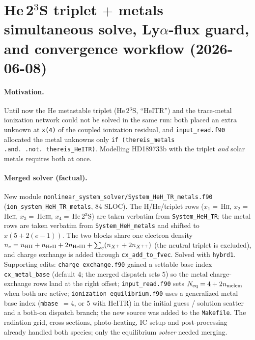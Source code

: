\documentclass[english,a4paper]{kiseon_memo}
\begin{document}
\section{He\,2$^3$S triplet $+$ metals simultaneous solve, Ly$\alpha$-flux guard, and convergence workflow (2026-06-08)}

\paragraph{Motivation.} Until now the He metastable triplet (He\,2$^3$S, ``HeITR'')
and the trace-metal ionization network could not be solved in the same run: both
placed an extra unknown at \texttt{x(4)} of the coupled ionization residual, and
\texttt{input\_read.f90} allocated the metal unknowns only \texttt{if (thereis\_metals
.and.\ .not.\ thereis\_HeITR)}. Modelling HD189733b with the triplet \emph{and} solar
metals requires both at once.

\paragraph{Merged solver (factual).} New module
\texttt{nonlinear\_system\_solver/System\_HeH\_TR\_metals.f90}
(\texttt{ion\_system\_HeH\_TR\_metals}, 84 SLOC). The H/He/triplet rows
($x_1{=}$\,H\textsc{ii}, $x_2{=}$\,He\textsc{ii}, $x_3{=}$\,He\textsc{iii},
$x_4{=}$\,He\,2$^3$S) are taken verbatim from \texttt{System\_HeH\_TR}; the metal rows
are taken verbatim from \texttt{System\_HeH\_metals} and shifted to $x(5{+}2(e{-}1))$.
The two blocks share one electron density $n_e = n_{\rm HII} + n_{\rm HeII} +
2n_{\rm HeIII} + \sum_e (n_{X^+} + 2n_{X^{++}})$ (the neutral triplet is excluded), and
charge exchange is added through \texttt{cx\_add\_to\_fvec}. Solved with \texttt{hybrd1}.
Supporting edits: \texttt{charge\_exchange.f90} gained a settable base index
\texttt{cx\_metal\_base} (default 4; the merged dispatch sets 5) so the metal
charge-exchange rows land at the right offset; \texttt{input\_read.f90} sets
$N_{\rm eq}=4+2n_{\rm melem}$ when both are active; \texttt{ionization\_equilibrium.f90}
uses a generalized metal base index (\texttt{mbase}~$=4$, or 5 with HeITR) in the
initial guess / solution scatter and a both-on dispatch branch; the new source was
added to the \texttt{Makefile}. The radiation grid, cross sections, photo-heating, IC
setup and post-processing already handled both species; only the equilibrium
\emph{solver} needed merging.
\end{document}
